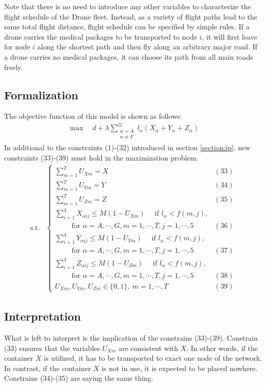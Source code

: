 \documentclass{mcmthesis}
\begin{document}
\noindent Note that there is no need to introduce any other variables to characterize the flight schedule of the Drone fleet. Instead, as a variety of flight paths lead to the same total flight distance, flight schedule can be specified by simple rules. If a drone carries the medical packages to be transported to node $i$, it will first leave for node $i$ along the shortest path and then fly along an arbitrary major road. If a drone carries no medical packages, it can choose its path from all main roads freely.

\subsection{Formalization}
The objective function of this model is shown as follows:
\[
\begin{aligned}
\max\quad d+\lambda\sum_{\substack{\alpha=A\\ \alpha\ne F}}^{G}l_\alpha (X_\alpha+Y_\alpha+Z_\alpha)
\end{aligned}
\]
In additional to the constraints (1)-(32) introduced in section \ref{section:ip}, new constraints (33)-(39) must hold in the maximization problem. 
\[
\begin{aligned}
\text{s.t.}&
\left\{
\begin{array}{lr}
\sum\limits_{m=1}^{T}U_{Xm}= X&(33)\\
\sum\limits_{m=1}^{T}U_{Ym}= Y&(34)\\
\sum\limits_{m=1}^{T}U_{Zm}= Z&(35)\\
\sum\limits_{i=1}^3X_{\alpha ij}\le M(1-U_{Xm})\quad\text{ if }l_{\alpha}< f(m,j) ,\\\qquad\text{ for }\alpha=A,\cdots,G,m=1,\cdots,T,j=1,\cdots,5&(36)\\
\sum\limits_{i=1}^3Y_{\alpha ij}\le M(1-U_{Ym})\quad\text{ if }l_{\alpha}< f(m,j)  ,\\\qquad\text{ for }\alpha=A,\cdots,G,m=1,\cdots,T,j=1,\cdots,5&(37)\\
\sum\limits_{i=1}^3Z_{\alpha ij}\le M(1-U_{Zm})\quad\text{ if }l_{\alpha}< f(m,j)  ,\\\qquad\text{ for }\alpha=A,\cdots,G,m=1,\cdots,T,j=1,\cdots,5&(38)\\
U_{Xm},U_{Ym},U_{Zm} \in \{0,1\},\ m=1,\cdots,T&(39)
\end{array}
\right.
\end{aligned}
\]
\subsection{Interpretation}
What is left to interpret is the implication of the constrains (33)-(39). Constrain (33) ensures that the variables $U_{Xm}$ are consistent with $X$. In other words, if the container $X$ is utilized, it has to be transported to exact one node of the network. In contrast, if the container $X$ is not in use, it is expected to be placed nowhere. Constrains (34)-(35) are saying the same thing. 
\end{document}
